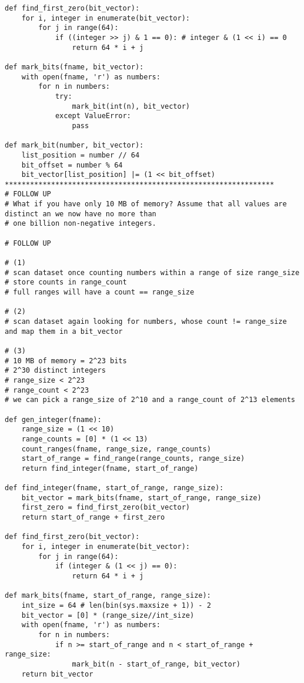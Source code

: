 \documentclass[12pt]{article}
\begin{document}
\begin{lstlisting}
def find_first_zero(bit_vector):
    for i, integer in enumerate(bit_vector):
        for j in range(64):
            if ((integer >> j) & 1 == 0): # integer & (1 << i) == 0
                return 64 * i + j

def mark_bits(fname, bit_vector):
    with open(fname, 'r') as numbers:
        for n in numbers:
            try:
                mark_bit(int(n), bit_vector)
            except ValueError:
                pass

def mark_bit(number, bit_vector):
    list_position = number // 64
    bit_offset = number % 64
    bit_vector[list_position] |= (1 << bit_offset)
****************************************************************
# FOLLOW UP
# What if you have only 10 MB of memory? Assume that all values are distinct an we now have no more than
# one billion non-negative integers.

# FOLLOW UP

# (1)
# scan dataset once counting numbers within a range of size range_size
# store counts in range_count
# full ranges will have a count == range_size

# (2)
# scan dataset again looking for numbers, whose count != range_size and map them in a bit_vector

# (3)
# 10 MB of memory = 2^23 bits
# 2^30 distinct integers
# range_size < 2^23
# range_count < 2^23
# we can pick a range_size of 2^10 and a range_count of 2^13 elements

def gen_integer(fname):
    range_size = (1 << 10)
    range_counts = [0] * (1 << 13)
    count_ranges(fname, range_size, range_counts)
    start_of_range = find_range(range_counts, range_size)
    return find_integer(fname, start_of_range)

def find_integer(fname, start_of_range, range_size):
    bit_vector = mark_bits(fname, start_of_range, range_size)
    first_zero = find_first_zero(bit_vector)
    return start_of_range + first_zero

def find_first_zero(bit_vector):
    for i, integer in enumerate(bit_vector):
        for j in range(64):
            if (integer & (1 << j) == 0):
                return 64 * i + j
    
def mark_bits(fname, start_of_range, range_size):
    int_size = 64 # len(bin(sys.maxsize + 1)) - 2
    bit_vector = [0] * (range_size//int_size)
    with open(fname, 'r') as numbers:
        for n in numbers:
            if n >= start_of_range and n < start_of_range + range_size:
                mark_bit(n - start_of_range, bit_vector)
    return bit_vector


\end{lstlisting}
\end{document}
